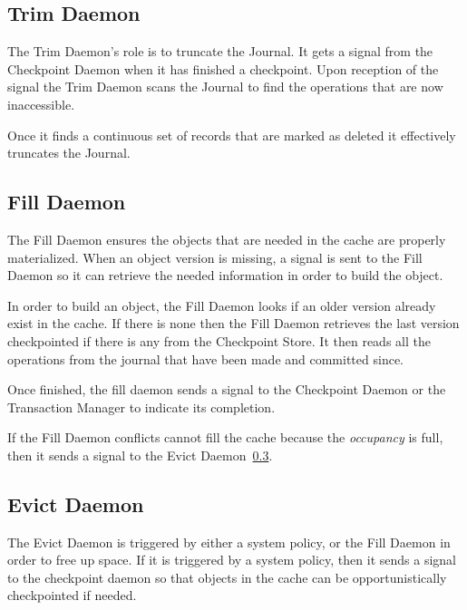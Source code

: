 \documentclass[11pt]{article}
\begin{document}
\subsection{Trim Daemon}
\label{sec:trim-daemon}

The Trim Daemon's role is to truncate the Journal. 
It gets a signal from the Checkpoint Daemon when it has finished a checkpoint.
Upon reception of the signal the Trim Daemon scans the Journal to find 
the operations that are now inaccessible.

Once it finds a continuous set of records that are marked as deleted it 
effectively truncates the Journal.

\subsection{Fill Daemon}
\label{sec:fill-daemon}

The Fill Daemon ensures the objects that are needed in the cache are properly
materialized. 
When an object version is missing, a signal is sent to the Fill Daemon so it 
can retrieve the needed information in order to build the object.

In order to build an object, the Fill Daemon looks if an older version
already exist in the cache. 
If there is none then the Fill Daemon retrieves the last version checkpointed
if there is any from the Checkpoint Store.
It then reads all the operations from the journal that have been made and committed
since.

Once finished, the fill daemon sends a signal to the Checkpoint Daemon or the 
Transaction Manager to indicate its completion.

If the Fill Daemon conflicts cannot fill the cache because the \emph{occupancy}
is full, then it sends a signal to the Evict Daemon~\ref{sec:evict-daemon}.

\subsection{Evict Daemon}
\label{sec:evict-daemon}
 
The Evict Daemon is triggered by either a system policy, or the Fill Daemon in 
order to free up space. 
If it is triggered by a system policy, then it sends a signal to the 
checkpoint daemon so that objects in the cache can be opportunistically
checkpointed if needed.

\end{document}
